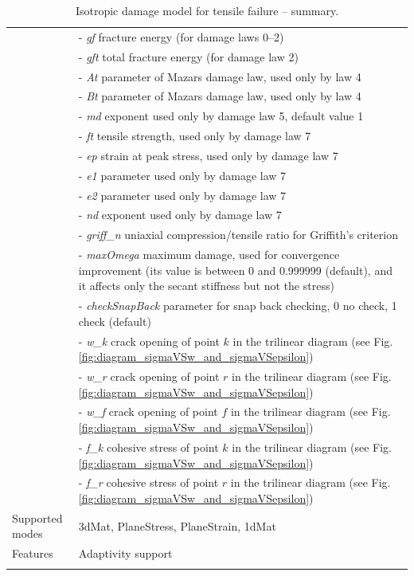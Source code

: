 \documentclass[a4paper]{article}
\newcommand{\param}[1]{{\it #1}}
\begin{document}
\begin{longtable}{|l|p{9cm}|}
&- \param{gf} fracture energy (for damage laws 0--2)\\
&- \param{gft} total fracture energy (for damage law 2)\\
&- \param{At} parameter of Mazars damage law, used only by law 4\\
&- \param{Bt} parameter of Mazars damage law, used only by law 4\\
&- \param{md} exponent used only by damage law 5, default value 1\\
&- \param{ft} tensile strength, used only by damage law 7\\
&- \param{ep} strain at peak stress, used only by damage law 7\\
&- \param{e1} parameter used only by damage law 7\\
&- \param{e2} parameter used only by damage law 7\\
&- \param{nd} exponent used only by damage law 7\\
&- \param{griff\_n} uniaxial compression/tensile ratio for Griffith's criterion\\
&- \param{maxOmega} maximum damage, used for convergence improvement
(its value is between 0 and 0.999999 (default), and it affects only the secant stiffness
but not the stress)\\
&- \param{checkSnapBack} parameter for snap back checking, 0 no check, 1 check (default)\\
&- \param{w\_k} crack opening of point $k$ in the trilinear diagram (see Fig. \ref{fig:diagram_sigmaVSw_and_sigmaVSepsilon})\\
&- \param{w\_r} crack opening of point $r$ in the trilinear diagram (see Fig. \ref{fig:diagram_sigmaVSw_and_sigmaVSepsilon})\\
&- \param{w\_f} crack opening of point $f$ in the trilinear diagram (see Fig. \ref{fig:diagram_sigmaVSw_and_sigmaVSepsilon})\\
&- \param{f\_k} cohesive stress of point $k$ in the trilinear diagram (see Fig. \ref{fig:diagram_sigmaVSw_and_sigmaVSepsilon})\\
&- \param{f\_r} cohesive stress of point $r$ in the trilinear diagram (see Fig. \ref{fig:diagram_sigmaVSw_and_sigmaVSepsilon})\\
Supported modes& 3dMat, PlaneStress, PlaneStrain, 1dMat\\
Features & Adaptivity support\\
\hline
\caption{Isotropic damage model for tensile failure -- summary.}
\label{id_table}
\end{longtable}
\end{document}
